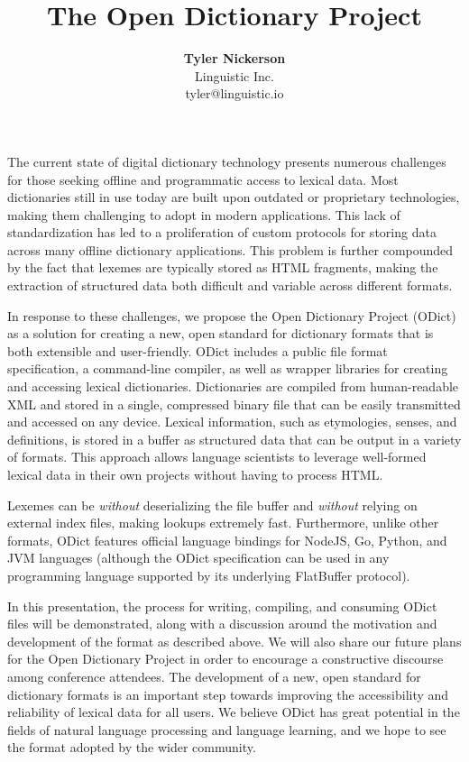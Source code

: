 \documentclass{article}
\begin{document}
\title{\textbf{The Open Dictionary Project}}
\author{\textbf{Tyler Nickerson} \\ \small{Linguistic Inc.} \\ \small{tyler@linguistic.io}}
\date{}
\maketitle
The current state of digital dictionary technology presents numerous challenges for those seeking offline and programmatic access to lexical data. Most dictionaries still in use today are built upon outdated or proprietary technologies, making them challenging to adopt in modern applications. This lack of standardization has led to a proliferation of custom protocols for storing data across many offline dictionary applications. This problem is further compounded by the fact that lexemes are typically stored as HTML fragments, making the extraction of structured data both difficult and variable across different formats.

In response to these challenges, we propose the Open Dictionary Project (ODict) as a solution for creating a new, open standard for dictionary formats that is both extensible and user-friendly. ODict includes a public file format specification, a command-line compiler, as well as wrapper libraries for creating and accessing lexical dictionaries. Dictionaries are compiled from human-readable XML and stored in a single, compressed binary file that can be easily transmitted and accessed on any device. Lexical information, such as etymologies, senses, and definitions, is stored in a buffer as structured data that can be output in a variety of formats. This approach allows language scientists to leverage well-formed lexical data in their own projects without having to process HTML.

Lexemes can be \emph{without} deserializing the file buffer and \emph{without} relying on external index files, making lookups extremely fast. Furthermore, unlike other formats, ODict features official language bindings for NodeJS, Go, Python, and JVM languages (although the ODict specification can be used in any programming language supported by its underlying FlatBuffer protocol).

In this presentation, the process for writing, compiling, and consuming ODict files will be demonstrated, along with a discussion around the motivation and development of the format as described above. We will also share our future plans for the Open Dictionary Project in order to encourage a constructive discourse among conference attendees. The development of a new, open standard for dictionary formats is an important step towards improving the accessibility and reliability of lexical data for all users. We believe ODict has great potential in the fields of natural language processing and language learning, and we hope to see the format adopted by the wider community.
\end{document}
